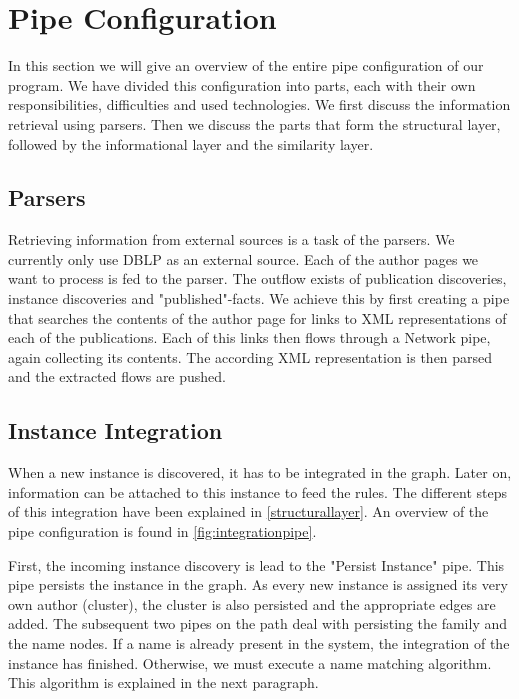 \section{Pipe Configuration}

In this section we will give an overview of the entire pipe configuration of our program. We have divided this configuration into parts, each with their own responsibilities, difficulties and used technologies. We first discuss the information retrieval using parsers. Then we discuss the parts that form the structural layer, followed by the informational layer and the similarity layer.

\subsection{Parsers}

Retrieving information from external sources is a task of the parsers. We currently only use DBLP as an external source. Each of the author pages we want to process is fed to the parser. The outflow exists of publication discoveries, instance discoveries and "published"-facts. We achieve this by first creating a pipe that searches the contents of the author page for links to XML representations of each of the publications. Each of this links then flows through a Network pipe, again collecting its contents. The according XML representation is then parsed and the extracted flows are pushed.

\subsection{Instance Integration}

When a new instance is discovered, it has to be integrated in the graph. Later on, information can be attached to this instance to feed the rules. The different steps of this integration have been explained in \autoref{structurallayer}. An overview of the pipe configuration is found in \autoref{fig:integrationpipe}.

First, the incoming instance discovery is lead to the "Persist Instance" pipe. This pipe persists the instance in the graph. As every new instance is assigned its very own author (cluster), the cluster is also persisted and the appropriate edges are added. The subsequent two pipes on the path deal with persisting the family and the name nodes. If a name is already present in the system, the integration of the instance has finished. Otherwise, we must execute a name matching algorithm. This algorithm is explained in the next paragraph.

